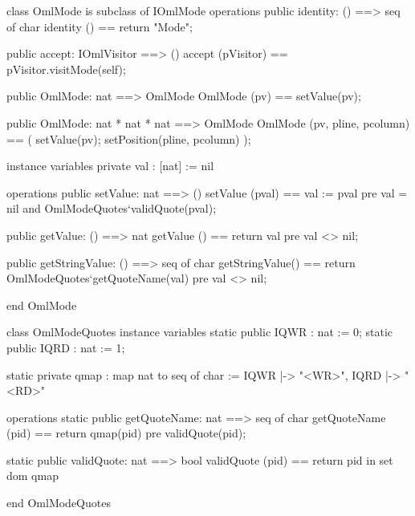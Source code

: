 \begin{vdm_al}
class OmlMode is subclass of IOmlMode
operations
  public identity: () ==> seq of char
  identity () == return "Mode";

  public accept: IOmlVisitor ==> ()
  accept (pVisitor) == pVisitor.visitMode(self);

  public OmlMode: nat ==> OmlMode
  OmlMode (pv) == setValue(pv);

  public OmlMode: nat * nat * nat ==> OmlMode
  OmlMode (pv, pline, pcolumn) == ( setValue(pv); setPosition(pline, pcolumn) );

instance variables
  private val : [nat] := nil

operations
  public setValue: nat ==> ()
  setValue (pval) == val := pval
    pre val = nil and OmlModeQuotes`validQuote(pval);

  public getValue: () ==> nat
  getValue () == return val
    pre val <> nil;

  public getStringValue: () ==> seq of char
  getStringValue() == return OmlModeQuotes`getQuoteName(val)
    pre val <> nil;

end OmlMode
\end{vdm_al}
\begin{vdm_al}
class OmlModeQuotes
instance variables
  static public IQWR : nat := 0;
  static public IQRD : nat := 1;

  static private qmap : map nat to seq of char :=
    { IQWR |-> "<WR>",
      IQRD |-> "<RD>" }

operations
  static public getQuoteName: nat ==> seq of char
  getQuoteName (pid) ==
    return qmap(pid)
    pre validQuote(pid);

  static public validQuote: nat ==> bool
  validQuote (pid) == return pid in set dom qmap

end OmlModeQuotes
\end{vdm_al}
